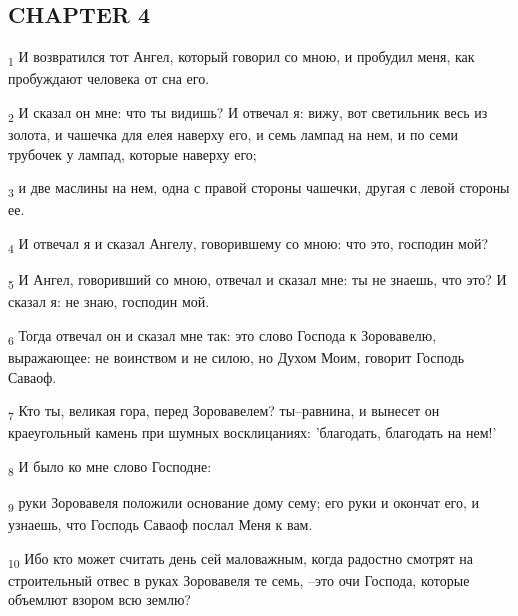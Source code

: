 \subsection{CHAPTER 4}
\begin{tcolorbox}
\textsubscript{1} И возвратился тот Ангел, который говорил со мною, и пробудил меня, как пробуждают человека от сна его.
\end{tcolorbox}
\begin{tcolorbox}
\textsubscript{2} И сказал он мне: что ты видишь? И отвечал я: вижу, вот светильник весь из золота, и чашечка для елея наверху его, и семь лампад на нем, и по семи трубочек у лампад, которые наверху его;
\end{tcolorbox}
\begin{tcolorbox}
\textsubscript{3} и две маслины на нем, одна с правой стороны чашечки, другая с левой стороны ее.
\end{tcolorbox}
\begin{tcolorbox}
\textsubscript{4} И отвечал я и сказал Ангелу, говорившему со мною: что это, господин мой?
\end{tcolorbox}
\begin{tcolorbox}
\textsubscript{5} И Ангел, говоривший со мною, отвечал и сказал мне: ты не знаешь, что это? И сказал я: не знаю, господин мой.
\end{tcolorbox}
\begin{tcolorbox}
\textsubscript{6} Тогда отвечал он и сказал мне так: это слово Господа к Зоровавелю, выражающее: не воинством и не силою, но Духом Моим, говорит Господь Саваоф.
\end{tcolorbox}
\begin{tcolorbox}
\textsubscript{7} Кто ты, великая гора, перед Зоровавелем? ты--равнина, и вынесет он краеугольный камень при шумных восклицаниях: 'благодать, благодать на нем!'
\end{tcolorbox}
\begin{tcolorbox}
\textsubscript{8} И было ко мне слово Господне:
\end{tcolorbox}
\begin{tcolorbox}
\textsubscript{9} руки Зоровавеля положили основание дому сему; его руки и окончат его, и узнаешь, что Господь Саваоф послал Меня к вам.
\end{tcolorbox}
\begin{tcolorbox}
\textsubscript{10} Ибо кто может считать день сей маловажным, когда радостно смотрят на строительный отвес в руках Зоровавеля те семь, --это очи Господа, которые объемлют взором всю землю?
\end{tcolorbox}
